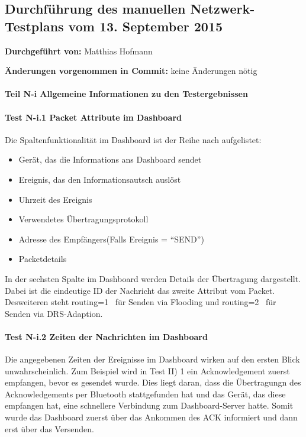 \subsection{Durchführung des manuellen Netzwerk-Testplans vom 13. September 2015}

\textbf{Durchgeführt von:} Matthias Hofmann

\textbf{Änderungen vorgenommen in Commit:} keine Änderungen nötig

\paragraph{Teil N-i Allgemeine Informationen zu den Testergebnissen}

\paragraph{Test N-i.1 Packet Attribute im Dashboard}

Die Spaltenfunktionalität im Dashboard ist der Reihe nach aufgelistet:

\begin{itemize}
  \item Gerät, das die Informations ans Dashboard sendet
  \item Ereignis, das den Informationsautsch auslöst
  \item Uhrzeit des Ereignis
  \item Verwendetes Übertragungsprotokoll
  \item Adresse des Empfängers(Falls Ereignis = ``SEND'')
  \item Packetdetails
\end{itemize}

In der sechsten Spalte im Dashboard werden Details der Übertragung dargestellt. Dabei ist die eindeutige ID der Nachricht das zweite Attribut vom Packet. Desweiteren steht \glqq routing=1\grqq~ für Senden via Flooding und \glqq routing=2\grqq~ für Senden via DRS-Adaption.

\paragraph{Test N-i.2 Zeiten der Nachrichten im Dashboard}

Die angegebenen Zeiten der Ereignisse im Dashboard wirken auf den ersten Blick unwahrscheinlich. Zum Beispiel wird in Test II) 1 ein Acknowledgement zuerst empfangen, bevor es gesendet wurde. Dies liegt daran, dass die Übertragungn des Acknowledgements per Bluetooth stattgefunden hat und das Gerät, das diese empfangen hat, eine schnellere Verbindung zum Dashboard-Server hatte. Somit wurde das Dashboard zuerst über das Ankommen des ACK informiert und dann erst über das Versenden.

